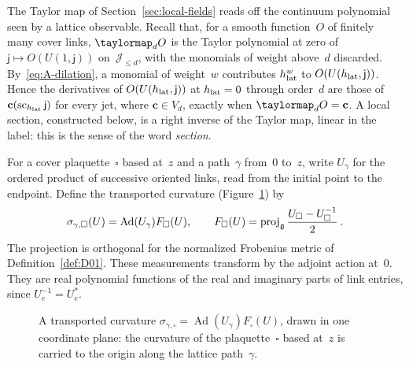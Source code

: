 The Taylor map of Section~\ref{sec:local-fields} reads off the continuum polynomial seen by a lattice observable. Recall that, for a smooth function~$O$ of finitely many cover links, $\taylormap_{d}O$ is the Taylor polynomial at zero of $\mathsf j\mapsto O(U(1,\mathsf j))$ on~$\mathcal J_{\le d}$, with the monomials of weight above~$d$ discarded. By~\eqref{eq:A-dilation}, a monomial of weight~$w$ contributes $h_{\rm lat}^w$ to $O(U(h_{\rm lat},\mathsf j))$. Hence the derivatives of $O(U(h_{\rm lat},\mathsf j))$ at $h_{\rm lat}=0$ through order~$d$ are those of $\mathbf c(\operatorname{sc}_{h_{\rm lat}}\mathsf j)$ for every jet, where $\mathbf c\in V_d$, exactly when $\taylormap_{d}O=\mathbf c$. A local section, constructed below, is a right inverse of the Taylor map, linear in the label: this is the sense of the word \emph{section}.

For a cover plaquette~$\square$ based at~$z$ and a path~$\gamma$ from~$0$ to~$z$, write $U_\gamma$ for the ordered product of successive oriented links, read from the initial point to the endpoint. Define the transported curvature (Figure~\ref{fig:A-transported}) by
\begin{equation*}
\sigma_{\gamma,\square}(U)=\operatorname{Ad}(U_\gamma)F_\square(U),\qquad
F_\square(U)=\operatorname{proj}_{\mathfrak{g}}\frac{U_\square-U_\square^{-1}}2\,.
\end{equation*}
The projection is orthogonal for the normalized Frobenius metric of Definition~\ref{def:D01}. These measurements transform by the adjoint action at~$0$. They are real polynomial functions of the real and imaginary parts of link entries, since $U_e^{-1}=U_e^*$.

\begin{figure}[ht]
\centering
{}
\caption{A transported curvature $\sigma_{\gamma,\square}=\operatorname{Ad}(U_\gamma)F_\square(U)$, drawn in one coordinate plane: the curvature of the plaquette~$\square$ based at~$z$ is carried to the origin along the lattice path~$\gamma$.}\label{fig:A-transported}
\end{figure}

